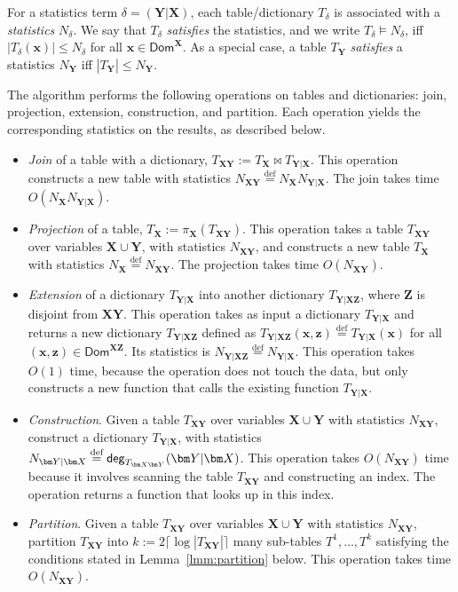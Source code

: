 \documentclass{theoretics}
\newcommand{\dom}{\textsf{Dom}}
\newcommand{\degree}{\text{\sf deg}}
\newcommand{\defeq}{\stackrel{\text{def}}{=}}
\begin{document}
For a statistics term $\delta = (\bm Y | \bm X)$, each table/dictionary $T_\delta$ is
associated with a {\em statistics} $N_\delta$. We say that $T_\delta$ {\em satisfies} the
statistics, and we write $T_\delta \models N_\delta$, iff $|T_\delta(\bm x)| \leq N_\delta$
for all $\bm x \in \dom^{\bm X}$. As a special case, a table $T_{\bm Y}$ {\em satisfies} a
statistics $N_{\bm Y}$ iff $|T_{\bm Y}| \leq N_{\bm Y}$.

The algorithm performs the following operations on tables and dictionaries:
join, projection, extension, construction, and partition.
Each operation yields the corresponding statistics on the results, as described below.

\begin{itemize}
\item {\em Join} of a table with a dictionary,
  $T_{\bm X\bm Y} := T_{\bm X} \Join T_{\bm Y|\bm X}$.  This operation
  constructs a new table with statistics
  $N_{\bm X\bm Y} \defeq N_{\bm X} N_{\bm Y|\bm X}$.  The join takes time $O(N_{\bm X} N_{\bm Y|\bm X})$.
\item {\em Projection} of a table, $T_{\bm X} := \pi_{\bm X}(T_{\bm X\bm Y})$.
This operation takes a table $T_{\bm X \bm Y}$ over variables $\bm X \cup \bm Y$,
with statistics $N_{\bm X\bm Y}$, and constructs a new table $T_{\bm X}$ with
  statistics $N_{\bm X} \defeq N_{\bm X\bm Y}$. The projection takes time
  $O(N_{\bm X\bm Y})$.
\item {\em Extension} of a dictionary $T_{\bm Y|\bm X}$ into another dictionary $T_{\bm
Y|\bm X\bm Z}$, where $\bm Z$ is disjoint from $\bm X\bm Y$. This operation takes as input a
dictionary $T_{\bm Y|\bm X}$ and returns a new dictionary $T_{\bm Y|\bm X\bm Z}$ defined as
$T_{\bm Y|\bm X\bm Z}(\bm x,\bm z) \defeq T_{\bm Y|\bm X}(\bm x)$ for all $
(\bm x,\bm z) \in \dom^{\bm X\bm Z}$.  Its statistics is $N_{\bm Y|\bm X\bm Z} \defeq N_{\bm Y|\bm X}$.
This operation takes $O(1)$ time, because the operation does not touch the data, but
only constructs a new function that calls the existing function $T_{\bm Y|\bm X}$.
\item {\em Construction}.  Given a table $T_{\bm X\bm Y}$
  over variables $\bm X \cup \bm Y$ with statistics $N_{\bm X\bm Y}$, construct a dictionary
  $T_{\bm Y|\bm X}$, with statistics
  $N_{\bm Y|\bm X} \defeq \degree_{T_{\bm X\bm Y}}(\bm Y|\bm X)$.
  This operation takes $O(N_{\bm X\bm Y})$ time because it involves
  scanning the table $T_{\bm X\bm Y}$ and constructing an index.
  The operation returns a function that looks up in this index.
\item {\em Partition}. Given a table $T_{\bm X\bm Y}$
over variables $\bm X \cup \bm Y$ with statistics $N_{\bm X\bm Y}$,
partition $T_{\bm X\bm Y}$ into $k:=2\lceil \log |T_{\bm X\bm Y}| \rceil$ many sub-tables
$T^{1},\dots,T^{k}$ satisfying the conditions stated in Lemma~\ref{lmm:partition}
below. This operation takes time $O(N_{\bm X\bm Y})$.
\end{itemize}
\end{document}
